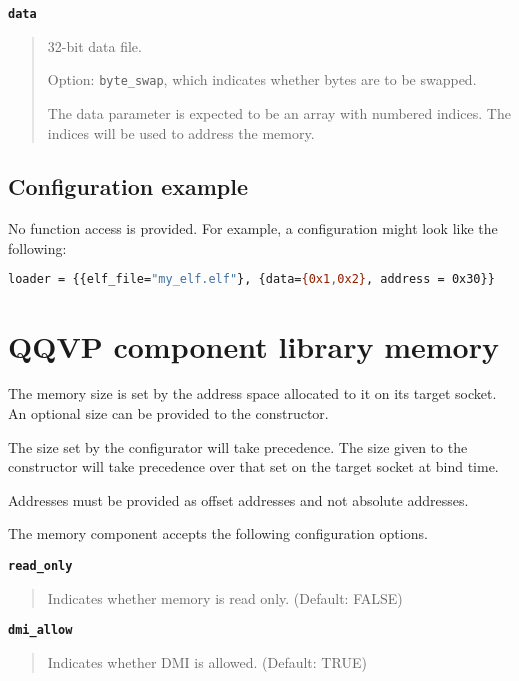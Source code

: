 {\textbf {\footnotesize{\lstinline!data!}}}
\vspace{-2pt}
\begin{quote}
32-bit data file.

Option: {\small{\lstinline!byte_swap!}}, which indicates whether bytes are to be swapped.

The data parameter is expected to be an array with numbered indices. The indices will be used to address the memory.
\end{quote}


\subsection{Configuration example}

No function access is provided. For example, a configuration might look like the following:

\small
\begin{lstlisting}[language=bash]
    loader = {{elf_file="my_elf.elf"}, {data={0x1,0x2}, address = 0x30}}
\end{lstlisting}
\normalsize


\clearpage
\section{QQVP component library memory}

The memory size is set by the address space allocated to it on its target socket. An optional size can be provided to the constructor.

The size set by the configurator will take precedence. The size given to the constructor will take precedence over that set on the target socket at bind time.

\note Addresses must be provided as offset addresses and not absolute addresses.

The memory component accepts the following configuration options.

{\textbf {\footnotesize{\lstinline!read_only!}}}
\vspace{-2pt}
\begin{quote}
Indicates whether memory is read only. (Default: FALSE)
\end{quote}


{\textbf {\footnotesize{\lstinline!dmi_allow!}}}
\vspace{-2pt}
\begin{quote}
Indicates whether DMI is allowed. (Default: TRUE)
\end{quote}


